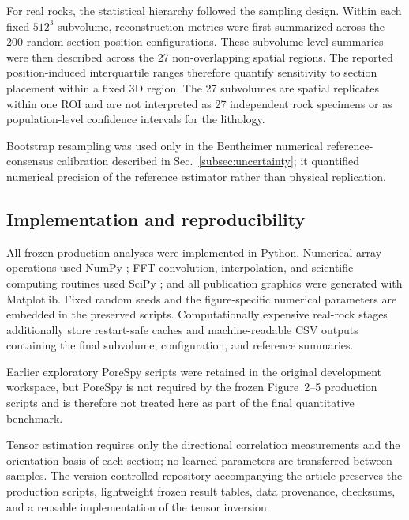 \documentclass{article}
\begin{document}
For real rocks, the statistical hierarchy followed the sampling design. Within
each fixed $512^3$ subvolume, reconstruction metrics were first summarized
across the 200 random section-position configurations. These subvolume-level
summaries were then described across the 27 non-overlapping spatial regions.
The reported position-induced interquartile ranges therefore quantify
sensitivity to section placement within a fixed 3D region. The 27 subvolumes
are spatial replicates within one ROI and are not interpreted as 27 independent
rock specimens or as population-level confidence intervals for the lithology.

Bootstrap resampling was used only in the Bentheimer numerical
reference-consensus calibration described in
Sec.~\ref{subsec:uncertainty}; it quantified numerical precision of the
reference estimator rather than physical replication.

\subsection{Implementation and reproducibility}
\label{subsec:implementation}

All frozen production analyses were implemented in Python. Numerical array
operations used NumPy \citep{Harris2020}; FFT convolution, interpolation, and
scientific computing routines used SciPy \citep{Virtanen2020}; and all
publication graphics were generated with Matplotlib. Fixed random seeds and
the figure-specific numerical parameters are embedded in the preserved
scripts. Computationally expensive real-rock stages additionally store
restart-safe caches and machine-readable CSV outputs containing the final
subvolume, configuration, and reference summaries.

Earlier exploratory PoreSpy scripts were retained in the original development
workspace, but PoreSpy is not required by the frozen Figure~2--5 production
scripts and is therefore not treated here as part of the final quantitative
benchmark.

Tensor estimation requires only the directional correlation measurements and
the orientation basis of each section; no learned parameters are transferred
between samples. The version-controlled repository accompanying the article
preserves the production scripts, lightweight frozen result tables, data
provenance, checksums, and a reusable implementation of the tensor inversion.

\end{document}
